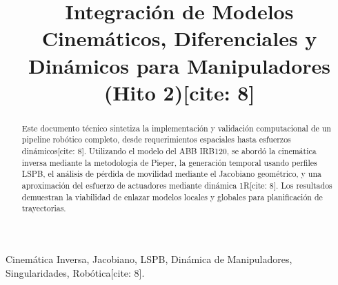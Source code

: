 \documentclass[conference]{IEEEtran}
\begin{document}
\title{Integración de Modelos Cinemáticos, Diferenciales y Dinámicos para Manipuladores (Hito 2)[cite: 8]}

\author{
    \and
    \and
    \and
}

\maketitle

\begin{abstract}
Este documento técnico sintetiza la implementación y validación computacional de un pipeline robótico completo, desde requerimientos espaciales hasta esfuerzos dinámicos[cite: 8]. Utilizando el modelo del ABB IRB120, se abordó la cinemática inversa mediante la metodología de Pieper, la generación temporal usando perfiles LSPB, el análisis de pérdida de movilidad mediante el Jacobiano geométrico, y una aproximación del esfuerzo de actuadores mediante dinámica 1R[cite: 8]. Los resultados demuestran la viabilidad de enlazar modelos locales y globales para planificación de trayectorias.
\end{abstract}

\begin{IEEEkeywords}
Cinemática Inversa, Jacobiano, LSPB, Dinámica de Manipuladores, Singularidades, Robótica[cite: 8].
\end{IEEEkeywords}
\end{document}
